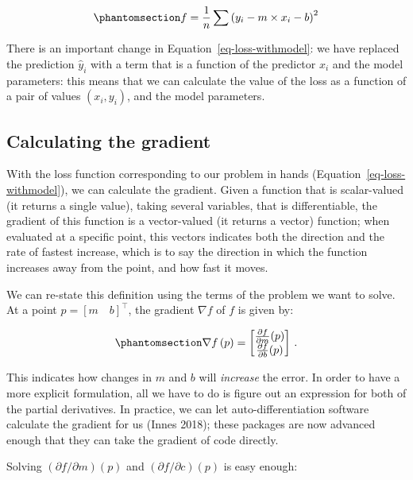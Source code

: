 \documentclass[
  letterpaper,
]{scrbook}
\begin{document}
\begin{equation}\phantomsection\label{eq-loss-withmodel}{
f = \frac{1}{n}\sum\left(y_i - m\times x_i - b\right)^2
}\end{equation}

There is an important change in Equation~\ref{eq-loss-withmodel}: we
have replaced the prediction \(\hat y_i\) with a term that is a function
of the predictor \(x_i\) and the model parameters: this means that we
can calculate the value of the loss as a function of a pair of values
\((x_i, y_i)\), and the model parameters.

\subsection{Calculating the
gradient}\label{sec-gradientdescent-gradient}

With the loss function corresponding to our problem in hands
(Equation~\ref{eq-loss-withmodel}), we can calculate the gradient. Given
a function that is scalar-valued (it returns a single value), taking
several variables, that is differentiable, the gradient of this function
is a vector-valued (it returns a vector) function; when evaluated at a
specific point, this vectors indicates both the direction and the rate
of fastest increase, which is to say the direction in which the function
increases away from the point, and how fast it moves.

We can re-state this definition using the terms of the problem we want
to solve. At a point \(p = [m\quad b]^\top\), the gradient \(\nabla f\)
of \(f\) is given by:

\begin{equation}\phantomsection\label{eq-gradientdescent-gradientfull}{
\nabla f\left(
p
\right) = 
\begin{bmatrix}
\frac{\partial f}{\partial m}(p) \\
\frac{\partial f}{\partial b}(p)
\end{bmatrix}\,.
}\end{equation}

This indicates how changes in \(m\) and \(b\) will \emph{increase} the
error. In order to have a more explicit formulation, all we have to do
is figure out an expression for both of the partial derivatives. In
practice, we can let auto-differentiation software calculate the
gradient for us (Innes 2018); these packages are now advanced enough
that they can take the gradient of code directly.

Solving \((\partial f / \partial m)(p)\) and
\((\partial f / \partial c)(p)\) is easy enough:
\end{document}
